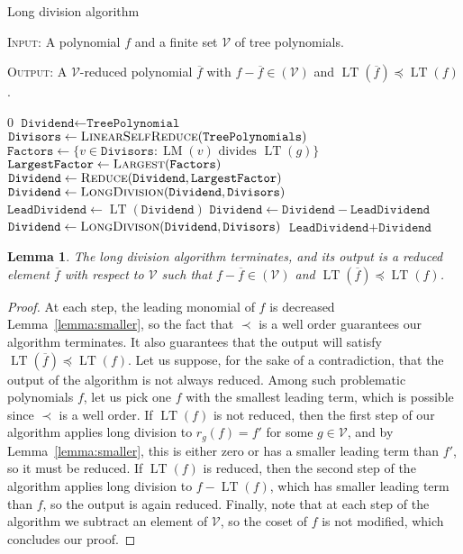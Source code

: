 \documentclass[fleqn, a4paper, twoside]{article}
\newcommand{\lead}[1]{\operatorname{LT}(#1)}
\newcommand{\leadm}[1]{\operatorname{LM}(#1)}
\newcommand{\0}{\langle 0\rangle}
\DeclareRobustCommand{\[}{\begin{equation}}%
\DeclareRobustCommand{\]}{\end{equation}}%
\theoremstyle{mytheorem}
\newtheorem{lemma}[theorem]{Lemma}
\theoremstyle{introthm}
\theoremstyle{mydefinition}
\theoremstyle{mydefinition2}
\theoremstyle{plain} %
\newcommand{\?}{\,?\,}
\theoremstyle{mytheorem}
\theoremstyle{plain} %
\begin{document}
\begin{algorithm}
\caption{Long division algorithm}\label{euclid}
\textsc{Input:} A polynomial $f$ and a finite set $\mathcal V$
of tree polynomials.

\textsc{Output:} A $\mathcal V$-reduced polynomial $\overline{f}$ with $f-\overline{f} \in (\mathcal V)$ and $\lead{\overline{f}}
\preceq \lead{f}$.
\begin{adjustwidth}{1 cm}{1 cm}
\begin{algorithmic}[1]
 \Return $0$
	 \Else
	 \State $\texttt{Dividend} \gets \texttt{TreePolynomial}$
	 \State $\texttt{Divisors} \gets 
	 	\textsc{LinearSelfReduce}(\texttt{TreePolynomials})$
	 \State $\texttt{Factors} \gets \{ v\in \texttt{Divisors} :\leadm{v} \text{ divides } \lead{g}\}$
	\State $\texttt{LargestFactor}\gets \textsc{Largest}(\texttt{Factors})$   
	\State $\texttt{Dividend}\gets \textsc{Reduce}(\texttt{Dividend},\texttt{LargestFactor})$ 
	\State $\texttt{Dividend}\gets \textsc{LongDivision}(\texttt{Dividend},\texttt{Divisors})$  
		\EndIf
	\State $\texttt{LeadDividend} \gets \lead{\texttt{Dividend}}$
	\State $\texttt{Dividend} \gets \texttt{Dividend}-\texttt{LeadDividend}$
	\State $\texttt{Dividend} \gets \textsc{LongDivison}(\texttt{Dividend},\texttt{Divisors})$
	\EndIf
	\State \Return $\texttt{LeadDividend} + \texttt{Dividend}$
\EndProcedure
\end{algorithmic}
\end{adjustwidth}
\end{algorithm}


\begin{lemma}
The long division algorithm terminates, and its
output is a reduced element $\overline{f}$ with respect to $\mathcal
V$ such that $f-\overline{f} \in (\mathcal V)$ and $\lead{\overline{f}}
\preceq \lead{f}$.
\end{lemma}


\begin{proof}
At each step, the leading monomial of $f$ is decreased Lemma~\ref{lemma:smaller},
so the fact that $\prec$ is a well order guarantees our algorithm
terminates. It also guarantees that the output will satisfy
$\lead{\overline{f}} \preceq \lead{f}$. Let us suppose, for the sake
of a contradiction, that the output of the algorithm is not
always reduced. Among such problematic polynomials $f$,
let us pick one $f$ with the smallest leading term, which is
possible since $\prec$ is a well order. If $\lead{f}$ is not
reduced, then the first step of our algorithm applies long
division to $r_g(f) = f'$ for some $g\in\mathcal V$, and
by Lemma~\ref{lemma:smaller}, this is either zero or has a smaller
leading term than $f'$, so it must be reduced. If $\lead{f}$
is reduced, then the second step of the algorithm applies long
division to $f-\lead{f}$, which has smaller leading term than
$f$, so the output is again reduced. Finally, note that
at each step of the algorithm we subtract an element of
$\mathcal V$, so the coset of $f$ is not modified,
which concludes our proof.
\end{proof}
\end{document}
